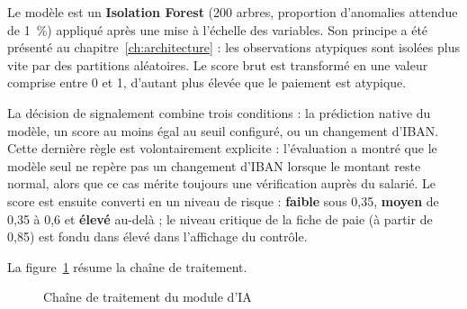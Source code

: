 Le modèle est un \textbf{Isolation Forest} (200 arbres, proportion d'anomalies attendue de 1~\%) appliqué après une mise à l'échelle des variables. Son principe a été présenté au chapitre~\ref{ch:architecture} : les observations atypiques sont isolées plus vite par des partitions aléatoires. Le score brut est transformé en une valeur comprise entre 0 et 1, d'autant plus élevée que le paiement est atypique.

La décision de signalement combine trois conditions : la prédiction native du modèle, un score au moins égal au seuil configuré, ou un changement d'IBAN. Cette dernière règle est volontairement explicite : l'évaluation a montré que le modèle seul ne repère pas un changement d'IBAN lorsque le montant reste normal, alors que ce cas mérite toujours une vérification auprès du salarié. Le score est ensuite converti en un niveau de risque : \textbf{faible} sous 0,35, \textbf{moyen} de 0,35 à 0,6 et \textbf{élevé} au-delà ; le niveau \og critique\fg{} de la fiche de paie (à partir de 0,85) est fondu dans \og élevé\fg{} dans l'affichage du contrôle.

La figure~\ref{fig:pipeline} résume la chaîne de traitement.

\begin{figure}[H]
\centering
{}
\caption{Chaîne de traitement du module d'IA}
\label{fig:pipeline}
\end{figure}

